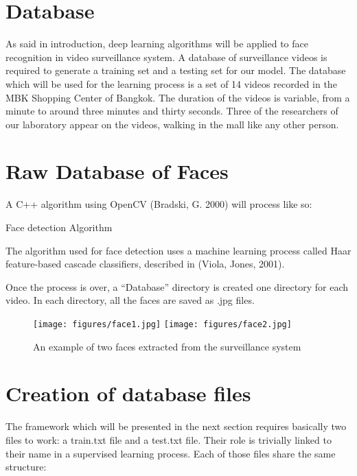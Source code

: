 \section{Database}
As said in introduction, deep learning algorithms will be applied to face recognition in video surveillance system. A database of surveillance videos is required to generate a training set and a testing set for our model.
The database which will be used for the learning process is a set of 14 videos recorded in the MBK Shopping Center of Bangkok. The duration of the videos is variable, from a minute to around three minutes and thirty seconds. Three of the researchers of our laboratory appear on the videos, walking in the mall like any other person.

\section{Raw Database of Faces}

A C++ algorithm using OpenCV (Bradski, G. 2000) will process like so:

\begin{algorithm}[H]
 \caption{Face detection Algorithm}
\end{algorithm}

The algorithm used for face detection uses a machine learning process called Haar feature-based cascade classifiers, described in (Viola, Jones, 2001).

Once the process is over, a \enquote{Database} directory is created one directory for each video. In each directory, all the faces are saved as .jpg files.

\begin{figure}[!ht]
  \centering
  \texttt{[image: figures/face1.jpg]}
  \texttt{[image: figures/face2.jpg]}
  \caption[An example of two faces extracted from the surveillance system]{An example of two faces extracted from the surveillance system}
  \label{fig:face}
\end{figure}

\section{Creation of database files}

The framework which will be presented in the next section requires basically two files to work: a train.txt file and a test.txt file. Their role is trivially linked to their name in a supervised learning process. Each of those files share the same structure:


